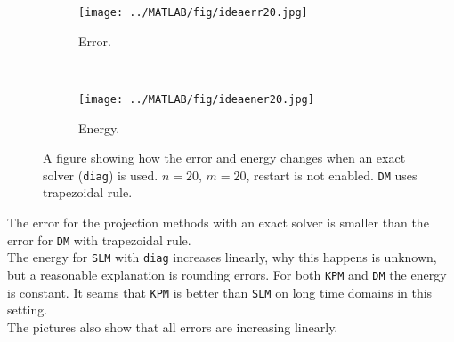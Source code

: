 \begin{figure}[H]
        \centering
        \begin{subfigure}[b]{0.45\textwidth}
                \texttt{[image: ../MATLAB/fig/ideaerr20.jpg]}
                \caption{ Error. }
                \label{fig:ideaerr20}
        \end{subfigure}%
        ~
        \begin{subfigure}[b]{0.45\textwidth}
                \texttt{[image: ../MATLAB/fig/ideaener20.jpg]}
                \caption{ Energy. }
                \label{fig:ideaener20}
        \end{subfigure}
        \caption{ A figure showing how the error and energy changes when an exact solver (\texttt{diag}) is used. $n = 20$, $m = 20$, restart is not enabled. \texttt{DM} uses trapezoidal rule. }
        \label{fig:idea0}
\end{figure}
\noindent The error for the projection methods with an exact solver is smaller than the error for \texttt{DM} with trapezoidal rule. \\
The energy for \texttt{SLM} with \texttt{diag} increases linearly, why this happens is unknown, but a reasonable explanation is rounding errors. For both \texttt{KPM} and \texttt{DM} the energy is constant. It seams that \texttt{KPM} is better than \texttt{SLM} on long time domains in this setting. \\
The pictures also show that all errors are increasing linearly. \\

